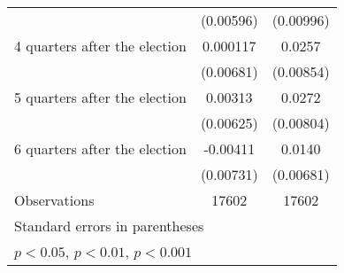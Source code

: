 \begin{table}[htbp]
\begin{tabular}{l*{2}{c}}
                    &   (0.00596)         &   (0.00996)         \\
[1em]
 4 quarters after the election&    0.000117         &      0.0257\sym{**} \\
                    &   (0.00681)         &   (0.00854)         \\
[1em]
 5 quarters after the election&     0.00313         &      0.0272\sym{***}\\
                    &   (0.00625)         &   (0.00804)         \\
[1em]
 6 quarters after the election&    -0.00411         &      0.0140\sym{*}  \\
                    &   (0.00731)         &   (0.00681)         \\
\hline
Observations        &       17602         &       17602         \\
\hline\hline
\multicolumn{3}{l}{\footnotesize Standard errors in parentheses}\\
\multicolumn{3}{l}{\footnotesize \sym{*} \(p<0.05\), \sym{**} \(p<0.01\), \sym{***} \(p<0.001\)}\\
\end{tabular}
\end{table}
